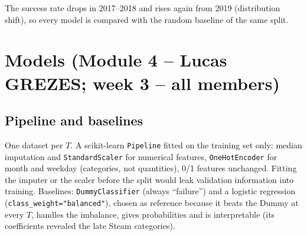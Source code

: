\documentclass[11pt,a4paper]{article}
\newcommand{\code}[1]{\texttt{#1}}
\begin{document}
The success rate drops in 2017--2018 and rises again from 2019 (distribution shift), so every model is
compared with the random baseline of the same split.

\section{Models (Module 4 -- Lucas GREZES; week 3 -- all members)}

\subsection{Pipeline and baselines}
One dataset per $T$. A scikit-learn \code{Pipeline} fitted on the training set only: median imputation and
\code{StandardScaler} for numerical features, \code{OneHotEncoder} for month and weekday (categories, not
quantities), 0/1 features unchanged. Fitting the imputer or the scaler before the split would leak
validation information into training.
Baselines: \code{DummyClassifier} (always ``failure'') and a logistic regression
(\code{class\_weight="balanced"}), chosen as reference because it beats the Dummy at every $T$, handles the
imbalance, gives probabilities and is interpretable (its coefficients revealed the late Steam categories).
\end{document}
